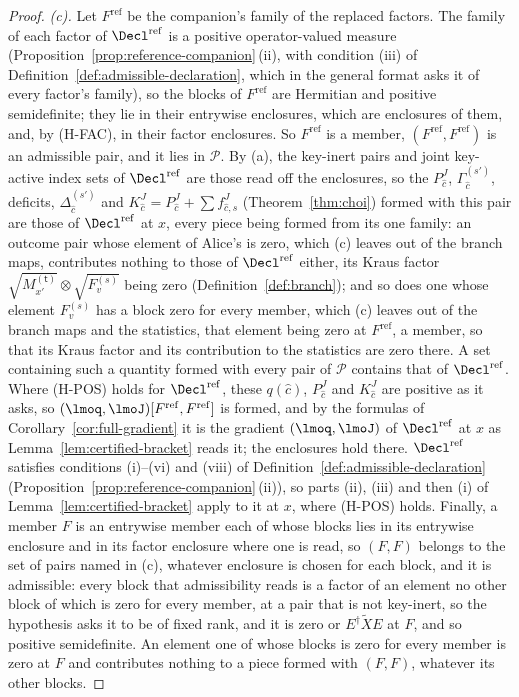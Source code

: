 \begin{proof}
\emph{(c).} Let $F^{\mathrm{ref}}$ be the companion's family of the replaced
factors. The family of each factor of $\Decl^{\mathrm{ref}}$ is a positive
operator-valued measure (Proposition~\ref{prop:reference-companion}\,(ii),
with condition (iii) of Definition~\ref{def:admissible-declaration}, which in
the general format asks it of every factor's family), so the blocks of
$F^{\mathrm{ref}}$ are Hermitian and positive semidefinite; they lie in their
entrywise enclosures, which are enclosures of them, and, by (H-FAC), in their
factor enclosures. So $F^{\mathrm{ref}}$ is a member,
$(F^{\mathrm{ref}},F^{\mathrm{ref}})$ is an admissible pair, and it lies in
$\mathcal P$. By (a), the key-inert pairs and joint key-active index sets of
$\Decl^{\mathrm{ref}}$ are those read off the enclosures, so the
$P^{J}_{\hat c}$, $\Gamma^{(s')}_{\hat c}$, deficits,
$\Delta^{(s')}_{\hat c}$ and $K^{J}_{\hat c}=P^{J}_{\hat c}+\sum
f^{J}_{\hat c,s}$ (Theorem~\ref{thm:choi}) formed with this pair are those of
$\Decl^{\mathrm{ref}}$ at $x$, every piece being formed from its one family:
an outcome pair whose element of Alice's is zero, which (c) leaves out of the
branch maps, contributes nothing to those of $\Decl^{\mathrm{ref}}$ either,
its Kraus factor $\sqrt{M^{(\mathsf t)}_{x'}}\otimes\sqrt{F^{(s)}_v}$ being
zero (Definition~\ref{def:branch}); and so does one whose element
$F^{(s)}_v$ has a block zero for every member, which (c) leaves out of the
branch maps and the statistics, that element being zero at
$F^{\mathrm{ref}}$, a member, so that its Kraus factor and its contribution
to the statistics are zero there. A set containing such a quantity formed
with every pair of
$\mathcal P$ contains that of $\Decl^{\mathrm{ref}}$. Where (H-POS) holds
for $\Decl^{\mathrm{ref}}$, these $q(\hat c)$, $P^{J}_{\hat c}$ and
$K^{J}_{\hat c}$ are positive as it asks, so
$(\lmoq,\lmoJ)[F^{\mathrm{ref}},F^{\mathrm{ref}}]$ is formed, and by the
formulas of Corollary~\ref{cor:full-gradient} it is the gradient
$(\lmoq,\lmoJ)$ of $\Decl^{\mathrm{ref}}$ at $x$ as
Lemma~\ref{lem:certified-bracket} reads it; the enclosures hold there.
$\Decl^{\mathrm{ref}}$ satisfies conditions (i)--(vi) and (viii) of
Definition~\ref{def:admissible-declaration}
(Proposition~\ref{prop:reference-companion}\,(ii)), so parts (ii), (iii)
and then (i) of Lemma~\ref{lem:certified-bracket} apply to it at $x$, where
(H-POS) holds. Finally, a
member $F$ is an entrywise member each of whose blocks lies in its entrywise
enclosure and in its factor enclosure where one is read, so $(F,F)$ belongs
to the set of pairs named in (c), whatever enclosure is chosen for each
block, and it is admissible: every block that admissibility reads is a factor
of an element no other block of which is zero for every member, at a pair
that is not key-inert, so the hypothesis asks it to be of fixed rank, and it
is zero or $E^{\dagger}\widetilde XE$ at $F$, and so positive semidefinite.
An element one of whose blocks is zero for every member is zero at $F$ and
contributes nothing to a piece formed with $(F,F)$, whatever its other
blocks.


\end{proof}
